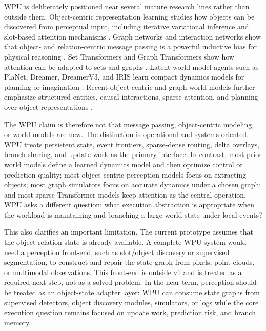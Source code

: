 \documentclass[11pt]{article}
\begin{document}
WPU is deliberately positioned near several mature research lines rather than
outside them. Object-centric representation learning studies how objects can be
discovered from perceptual input, including iterative variational inference and
slot-based attention mechanisms \cite{greff2019iodine,locatello2020slot}. Graph
networks and interaction networks show that object- and relation-centric message
passing is a powerful inductive bias for physical reasoning
\cite{battaglia2016interaction,battaglia2018relational,sanchezgonzalez2020gns}.
Set Transformers and Graph Transformers show how attention can be adapted to
sets and graphs \cite{lee2019set}. Latent world-model agents such as PlaNet,
Dreamer, DreamerV3, and IRIS learn compact dynamics models for planning or
imagination \cite{hafner2019planet,hafner2020dreamer,hafner2023dreamerv3,micheli2022iris}.
Recent object-centric and graph world models further emphasize structured
entities, causal interactions, sparse attention, and planning over object
representations
\cite{nishimoto2026stica,vakhitov2026objectzero,lei2025spartan,liu2026graphworldmodels}.

The WPU claim is therefore not that message passing, object-centric modeling, or
world models are new. The distinction is operational and systems-oriented. WPU
treats persistent state, event frontiers, sparse-dense routing, delta overlays,
branch sharing, and update work as the primary interface. In contrast, most
prior world models define a learned dynamics model and then optimize control or
prediction quality; most object-centric perception models focus on extracting
objects; most graph simulators focus on accurate dynamics under a chosen graph;
and most sparse Transformer models keep attention as the central operation. WPU
asks a different question: what execution abstraction is appropriate when the
workload is maintaining and branching a large world state under local events?

This also clarifies an important limitation. The current prototype assumes that
the object-relation state is already available. A complete WPU system would need
a perception front-end, such as slot/object discovery or supervised
segmentation, to construct and repair the state graph from pixels, point clouds,
or multimodal observations. This front-end is outside v1 and is treated as a
required next step, not as a solved problem. In the near term, perception should
be treated as an object-state adapter layer: WPU can consume state graphs from
supervised detectors, object discovery modules, simulators, or logs while the
core execution question remains focused on update work, prediction risk, and
branch memory.
\end{document}
